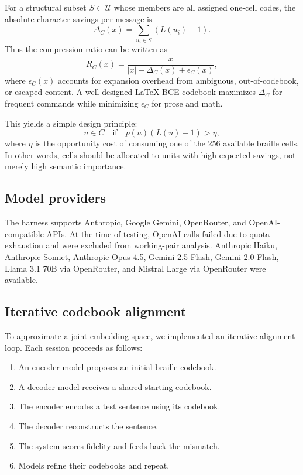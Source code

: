 \documentclass[11pt]{article}
\begin{document}
For a structural subset $S \subset \mathcal{U}$ whose members are all assigned one-cell codes, the absolute character savings per message is
\begin{equation}
  \Delta_C(x)
  =
  \sum_{u_i \in S} \left(L(u_i)-1\right).
\end{equation}
Thus the compression ratio can be written as
\begin{equation}
  R_C(x)
  =
  \frac{|x|}
       {|x|-\Delta_C(x)+\epsilon_C(x)},
\end{equation}
where $\epsilon_C(x)$ accounts for expansion overhead from ambiguous, out-of-codebook, or escaped content. A well-designed LaTeX BCE codebook maximizes $\Delta_C$ for frequent commands while minimizing $\epsilon_C$ for prose and math.

This yields a simple design principle:
\begin{equation}
  u \in C \quad \text{if} \quad p(u)\left(L(u)-1\right) > \eta,
\end{equation}
where $\eta$ is the opportunity cost of consuming one of the 256 available braille cells. In other words, cells should be allocated to units with high expected savings, not merely high semantic importance.

\subsection{Model providers}
The harness supports Anthropic, Google Gemini, OpenRouter, and OpenAI-compatible APIs. At the time of testing, OpenAI calls failed due to quota exhaustion and were excluded from working-pair analysis. Anthropic Haiku, Anthropic Sonnet, Anthropic Opus 4.5, Gemini 2.5 Flash, Gemini 2.0 Flash, Llama 3.1 70B via OpenRouter, and Mistral Large via OpenRouter were available.

\subsection{Iterative codebook alignment}
To approximate a joint embedding space, we implemented an iterative alignment loop. Each session proceeds as follows:
\begin{enumerate}[leftmargin=*]
  \item An encoder model proposes an initial braille codebook.
  \item A decoder model receives a shared starting codebook.
  \item The encoder encodes a test sentence using its codebook.
  \item The decoder reconstructs the sentence.
  \item The system scores fidelity and feeds back the mismatch.
  \item Models refine their codebooks and repeat.
\end{enumerate}
\end{document}
